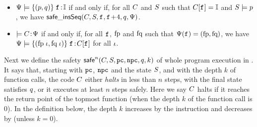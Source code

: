 \begin{definition}
	\em
	\label{def:soundness of instruction sequence}
	\mbox{}\\[-8pt]
    \begin{itemize}
    \item $\Psi \models \{({p}, {q})\} \; \texttt{f}_{} \!:\! {\mathbb{I}}$ if and only if, for all
    $C$ and $S$ such that $C[\texttt{f}_{}] = \mathbb{I}$
    and $S \models p$, we have
    $\mathsf{safe\_insSeq}(C, S, \texttt{f}_{}, \texttt{f}_{}\!+\!4, q, \Psi)$.
    \item
    $\models C \!:\! \Psi$ if and only if, for all
    $\texttt{f}_{}$, $\text{fp}$ and $\text{fq}$ %
    such that $\Psi(\texttt{f}_{}) = (\text{fp}, \text{fq})$,
    we have $\Psi \models \{({\text{fp} \; \iota}, {\text{fq} \; \iota})\} \; \texttt{f}_{} \!:\! {C[\texttt{f}_{}]}$
    for all $\iota$.
    \end{itemize}
\end{definition}


Next we define the safety
$\mathsf{safe}^{n}(C, S, \texttt{pc}, \texttt{npc}, q, k)$
of whole program execution in \Def{\ref{def:safety}}.
It says that,
    starting with $\texttt{pc}$, $\texttt{npc}$ and the state $S$,
    and with the depth $k$ of function calls,
    the code $C$ either {\em halts} in less than $n$ steps,
    with the final state satisfies $q$,
    or it executes at least $n$ steps safely.
    Here we say $C$ halts if it reaches the return
    point of the topmost function (when the depth $k$
    of the function call is $0$).
In the definition below,
the depth $k$ increases by the \call{} instruction
and decreases by \retl{} (unless $k=0$).


